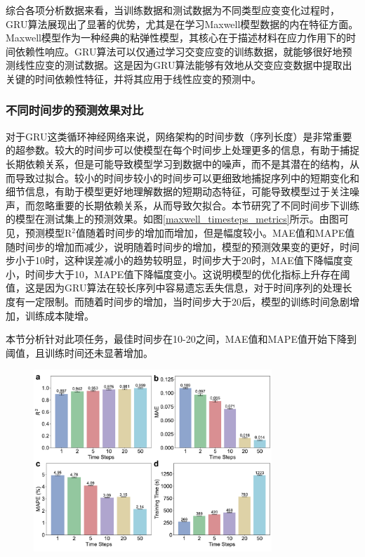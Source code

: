 综合各项分析数据来看，当训练数据和测试数据为不同类型应变变化过程时，GRU算法展现出了显著的优势，尤其是在学习Maxwell模型数据的内在特征方面。Maxwell模型作为一种经典的粘弹性模型，其核心在于描述材料在应力作用下的时间依赖性响应。GRU算法可以仅通过学习交变应变的训练数据，就能够很好地预测线性应变的测试数据。这是因为GRU算法能够有效地从交变应变数据中提取出关键的时间依赖性特征，并将其应用于线性应变的预测中。
\subsubsection{不同时间步的预测效果对比}
对于GRU这类循环神经网络来说，网络架构的时间步数（序列长度）是非常重要的超参数。较大的时间步可以使模型在每个时间步上处理更多的信息，有助于捕捉长期依赖关系，但是可能导致模型学习到数据中的噪声，而不是其潜在的结构，从而导致过拟合。较小的时间步较小的时间步可以更细致地捕捉序列中的短期变化和细节信息，有助于模型更好地理解数据的短期动态特征，可能导致模型过于关注噪声，而忽略重要的长期依赖关系，从而导致欠拟合。本节研究了不同时间步下训练的模型在测试集上的预测效果。如图\ref{maxwell_timesteps_metrics}所示。由图可见，预测模型R$^2$值随着时间步的增加而增加，但是幅度较小。MAE值和MAPE值随时间步的增加而减少，说明随着时间步的增加，模型的预测效果变的更好，时间步小于10时，这种误差减小的趋势较明显，时间步大于20时，MAE值下降幅度变小，时间步大于10，MAPE值下降幅度变小。这说明模型的优化指标上升存在阈值，这是因为GRU算法在较长序列中容易遗忘丢失信息，对于时间序列的处理长度有一定限制。而随着时间步的增加，当时间步大于20后，模型的训练时间急剧增加，训练成本陡增。

本节分析针对此项任务，最佳时间步在10-20之间，MAE值和MAPE值开始下降到阈值，且训练时间还未显著增加。
\begin{figure}[htbp]
  \centering
  \includegraphics[width=0.8\textwidth]{Fig/Maxwell_timesteps_metrics.pdf}
  \FigureBicaption{\label{maxwell_timesteps_metrics}}{}
\end{figure}

